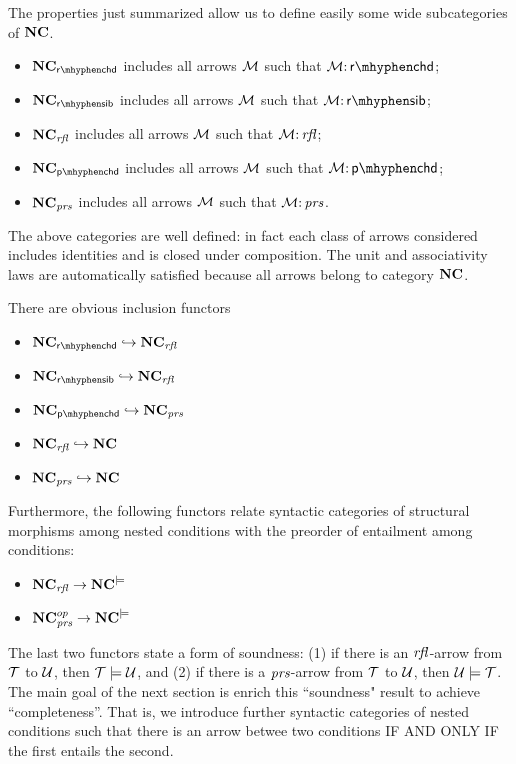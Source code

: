 The properties just summarized allow us to define easily some wide subcategories of $\NC$.

\begin{definition}[subcategories of $\NC$]
    \begin{itemize}
    \item $\NC_\rchd$ includes all arrows ${\mathcal{M}}$ such that $\cM\of \rchd$; 
    \item $\NC_\rsib$ includes all arrows ${\mathcal{M}}$ such that $\cM\of \rsib$;
    \item $\mathbf{NC}_{\mathit{rfl}}$ includes all arrows ${\mathcal{M}}$ such that ${\mathcal{M}}{:}\, \mathit{rfl}$;
    \item  $\NC_\pchd$ includes all arrows ${\mathcal{M}}$ such that $\cM\of \pchd$;
    \item $\mathbf{NC}_{\mathit{prs}}$ includes all arrows ${\mathcal{M}}$ such that ${\mathcal{M}}{:}\, \mathit{prs}$.
    \end{itemize}
    
    The above categories are well defined: in fact each class of arrows considered includes identities and is closed under composition. The unit and associativity laws are automatically satisfied because all arrows belong to category $\NC$.     
\end{definition}

\begin{proposition}
    There are obvious inclusion functors 
    \begin{itemize}
    \item $\NC_\rchd \hookrightarrow \NC_\rfl$
    \item $\NC_\rsib \hookrightarrow \NC_\rfl$
    \item $\NC_\pchd \hookrightarrow \NC_\prs$
    \item $\mathbf{NC}_{\mathit{rfl}} \hookrightarrow \mathbf{NC}$
    \item $\mathbf{NC}_{\mathit{prs}} \hookrightarrow \mathbf{NC}$
    \end{itemize}
    Furthermore, the following functors relate syntactic categories of structural morphisms among nested conditions with the preorder of entailment among conditions:
    \begin{itemize}
    \item $\mathbf{NC}_{\mathit{rfl}} \rightarrow \mathbf{NC}^{\models}$
    \item $\mathbf{NC}_{\mathit{prs}}^{op} \rightarrow \mathbf{NC}^{\models}$
    \end{itemize} 
\end{proposition}

The last two functors state a form of soundness: (1) if there is an $\mathit{rfl}$-arrow from ${\mathcal{T}}$ to ${\mathcal{U}}$, then ${\mathcal{T}} \models {\mathcal{U}}$, and (2)  if there is a $\mathit{prs}$-arrow from ${\mathcal{T}}$ to ${\mathcal{U}}$, then ${\mathcal{U}} \models {\mathcal{T}}$. 
The main goal of the next section is enrich this ``soundness" result to achieve ``completeness''. That is, we introduce further syntactic categories of nested conditions such that there is an arrow betwee two conditions IF AND ONLY IF the first entails the second.

